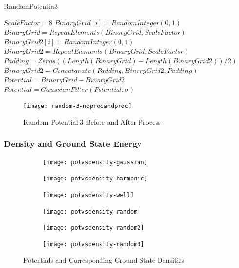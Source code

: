 \documentclass[a4paper,times,hidelinks,12pt]{article}
\begin{document}
\begin{algorithm}[H]
    \caption{RandomPotentia3}\label{euclid}
    \begin{algorithmic}[1]
        \State $ \textit{ScaleFactor} = 8$
        \State $BinaryGrid[i] = RandomInteger(0, 1)$
        \EndFor
        \State $BinaryGrid = RepeatElements(BinaryGrid, ScaleFactor)$
        \State $BinaryGrid2[i] = RandomInteger(0, 1)$
        \EndFor
        \State $BinaryGrid2 = RepeatElements(BinaryGrid, ScaleFactor)$
        \State $Padding = Zeros((Length(BinaryGrid) - Length(BinaryGrid2))/2)$
        \State $BinaryGrid2 = Concatanate(Padding, BinaryGrid2, Padding) $
        \State $Potential = BinaryGrid - BinaryGrid2$
        \State $Potential = GaussianFilter(Potential, \sigma)$ 
    \EndProcedure
    \end{algorithmic}
\label{alg:random_potential_1}
\end{algorithm}

\graphicspath{{"../figs/potentials/"}}
\begin{figure}[H]
    \centering
        \texttt{[image: random-3-noprocandproc]}
\caption{Random Potential 3 Before and After Process}
\label{fig:random3_before_after}
\end{figure}

\subsubsection{Density and Ground State Energy}

\graphicspath{{"../figs/potentials/"}}
\begin{figure}[H]
    \centering
    \begin{subfigure}[t]{0.45\textwidth}
        \texttt{[image: potvsdensity-gaussian]}
    \end{subfigure}
    \begin{subfigure}[t]{0.45\textwidth}
        \texttt{[image: potvsdensity-harmonic]}
    \end{subfigure}
    \begin{subfigure}[t]{0.45\textwidth}
        \texttt{[image: potvsdensity-well]}
    \end{subfigure}
    \begin{subfigure}[t]{0.45\textwidth}
        \texttt{[image: potvsdensity-random]}
    \end{subfigure}
    \begin{subfigure}[t]{0.45\textwidth}
        \texttt{[image: potvsdensity-random2]}
    \end{subfigure}
    \begin{subfigure}[t]{0.45\textwidth}
        \texttt{[image: potvsdensity-random3]}
    \end{subfigure}
\caption{Potentials and Corresponding Ground State Densities}
\label{fig:random3_before_after}
\end{figure}
\end{document}
